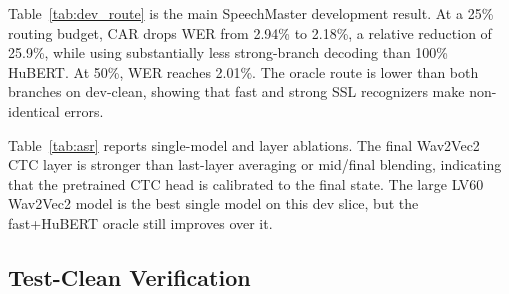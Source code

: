 \documentclass{article}
\begin{document}
Table~\ref{tab:dev_route} is the main SpeechMaster development result. At a
25\% routing budget, CAR drops WER from 2.94\% to 2.18\%, a relative reduction
of 25.9\%, while using substantially less strong-branch decoding than 100\%
HuBERT. At 50\%, WER reaches 2.01\%. The oracle route is lower than both
branches on dev-clean, showing that fast and strong SSL recognizers make
non-identical errors.

\begin{table}[t]
\centering
\caption{SpeechMaster-CAR routing on 1024 LibriSpeech dev-clean utterances.}
\label{tab:dev_route}
\small
{}
\end{table}

Table~\ref{tab:asr} reports single-model and layer ablations. The final
Wav2Vec2 CTC layer is stronger than last-layer averaging or mid/final blending,
indicating that the pretrained CTC head is calibrated to the final state. The
large LV60 Wav2Vec2 model is the best single model on this dev slice, but the
fast+HuBERT oracle still improves over it.

\begin{table}[t]
\centering
\caption{Single-model ASR and layer ablations on dev-clean.}
\label{tab:asr}
\small
{}
\end{table}

\subsection{Test-Clean Verification}
\end{document}
